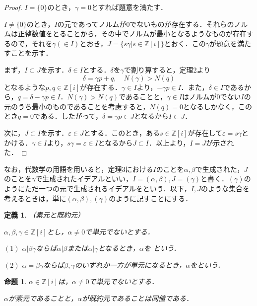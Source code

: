\documentclass[dvipdfmx]{jsarticle}
\newtheorem{proposition}{命題}
\newtheorem{defnition}{定義}
\begin{document}
\begin{proof}

$I=\{0\}$のとき，$\gamma=0$とすれば題意を満たす．

$I\neq\{0\}$のとき，$I$の元であってノルムが0でないものが存在する．それらのノルムは正整数値をとることから，その中でノルムが最小となるようなものが存在するので，それを$\gamma(\in I)$とおき，$J=\{s\gamma|s\in\mathbb{Z}[i]\}$とおく．この$\gamma$が題意を満たすことを示す．

まず，$I\subset J$を示す．$\delta\in I$とする．$\delta$を$\gamma$で割り算すると，定理2より
$$\delta=\gamma p+q,\quad N(\gamma)>N(q)$$
となるような$p,q\in\mathbb{Z}[i]$が存在する．$\gamma\in I$より，$-\gamma p\in I$．また，$\delta\in I$であるから，$q=\delta-\gamma p\in I$．$N(\gamma)>N(q)$であることと，$\gamma\in I$はノルムが0でない$I$の元のうち最小のものであることを考慮すると，$N(q)=0$となるしかなく，このとき$q=0$である．したがって，$\delta=\gamma p\in J$となるから$I\subset J$．

次に，$J\subset I$を示す．$\varepsilon\in J$とする．このとき，ある$s\in\mathbb{Z}[i]$が存在して$\varepsilon=s\gamma$とかける．$\gamma\in I$より，$s\gamma=\varepsilon\in I$となるから$J\subset I$．以上より，$I=J$が示された．
\end{proof}

なお，代数学の用語を用いると，定理3における$I$のことを$\alpha,\beta$で生成された，$J$のことを$\gamma$で生成されたイデアルといい，$I=(\alpha,\beta),J=(\gamma)$と書く．$(\gamma)$のようにただ一つの元で生成されるイデアルをという．以下，$I,J$のような集合を考えるときは，単に$(\alpha,\beta),(\gamma)$のように記すことにする．

\begin{defnition}{（素元と既約元）}

$\alpha,\beta,\gamma\in\mathbb{Z}[i]$とし，$\alpha\neq0$で単元でないとする．

$(1)$ $\alpha|\beta\gamma$ならば$\alpha|\beta$または$\alpha|\gamma$となるとき，$\alpha$を という．

$(2)$ $\alpha=\beta\gamma$ならば$\beta,\gamma$のいずれか一方が単元になるとき，$\alpha$をという．
\end{defnition}

\begin{proposition}

$\alpha\in\mathbb{Z}[i]$は，$\alpha\neq0$で単元でないとする．

$\alpha$が素元であることと，$\alpha$が既約元であることは同値である．
\end{proposition}
\end{document}
